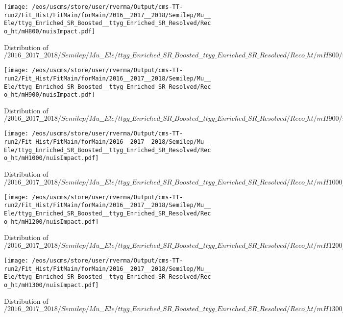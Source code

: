 \begin{figure}
\centering
\texttt{[image: /eos/uscms/store/user/rverma/Output/cms-TT-run2/Fit\_Hist/FitMain/forMain/2016\_\_2017\_\_2018/Semilep/Mu\_\_Ele/ttyg\_Enriched\_SR\_Boosted\_\_ttyg\_Enriched\_SR\_Resolved/Reco\_ht/mH800/nuisImpact.pdf]}
\caption{Distribution of $/2016\_\_2017\_\_2018/Semilep/Mu\_\_Ele/ttyg\_Enriched\_SR\_Boosted\_\_ttyg\_Enriched\_SR\_Resolved/Reco\_ht/mH800/nuisImpact.pdf$}
\end{figure}

\begin{figure}
\centering
\texttt{[image: /eos/uscms/store/user/rverma/Output/cms-TT-run2/Fit\_Hist/FitMain/forMain/2016\_\_2017\_\_2018/Semilep/Mu\_\_Ele/ttyg\_Enriched\_SR\_Boosted\_\_ttyg\_Enriched\_SR\_Resolved/Reco\_ht/mH900/nuisImpact.pdf]}
\caption{Distribution of $/2016\_\_2017\_\_2018/Semilep/Mu\_\_Ele/ttyg\_Enriched\_SR\_Boosted\_\_ttyg\_Enriched\_SR\_Resolved/Reco\_ht/mH900/nuisImpact.pdf$}
\end{figure}

\begin{figure}
\centering
\texttt{[image: /eos/uscms/store/user/rverma/Output/cms-TT-run2/Fit\_Hist/FitMain/forMain/2016\_\_2017\_\_2018/Semilep/Mu\_\_Ele/ttyg\_Enriched\_SR\_Boosted\_\_ttyg\_Enriched\_SR\_Resolved/Reco\_ht/mH1000/nuisImpact.pdf]}
\caption{Distribution of $/2016\_\_2017\_\_2018/Semilep/Mu\_\_Ele/ttyg\_Enriched\_SR\_Boosted\_\_ttyg\_Enriched\_SR\_Resolved/Reco\_ht/mH1000/nuisImpact.pdf$}
\end{figure}

\begin{figure}
\centering
\texttt{[image: /eos/uscms/store/user/rverma/Output/cms-TT-run2/Fit\_Hist/FitMain/forMain/2016\_\_2017\_\_2018/Semilep/Mu\_\_Ele/ttyg\_Enriched\_SR\_Boosted\_\_ttyg\_Enriched\_SR\_Resolved/Reco\_ht/mH1200/nuisImpact.pdf]}
\caption{Distribution of $/2016\_\_2017\_\_2018/Semilep/Mu\_\_Ele/ttyg\_Enriched\_SR\_Boosted\_\_ttyg\_Enriched\_SR\_Resolved/Reco\_ht/mH1200/nuisImpact.pdf$}
\end{figure}

\begin{figure}
\centering
\texttt{[image: /eos/uscms/store/user/rverma/Output/cms-TT-run2/Fit\_Hist/FitMain/forMain/2016\_\_2017\_\_2018/Semilep/Mu\_\_Ele/ttyg\_Enriched\_SR\_Boosted\_\_ttyg\_Enriched\_SR\_Resolved/Reco\_ht/mH1300/nuisImpact.pdf]}
\caption{Distribution of $/2016\_\_2017\_\_2018/Semilep/Mu\_\_Ele/ttyg\_Enriched\_SR\_Boosted\_\_ttyg\_Enriched\_SR\_Resolved/Reco\_ht/mH1300/nuisImpact.pdf$}
\end{figure}

